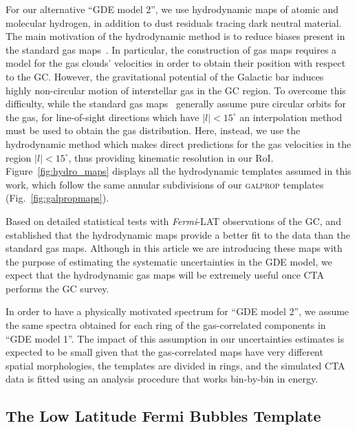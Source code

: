 \documentclass[doublespace,draft,nopageskip]{VTthesis} %
\begin{document}
For our alternative ``GDE model 2'', we use hydrodynamic maps of atomic and molecular hydrogen, in addition to dust residuals tracing dark neutral material. The main motivation of the hydrodynamic method is to reduce biases present in the standard gas maps~\citep{Ackermann:2012}. In particular, the construction of gas maps requires a model for the gas clouds' velocities in order to obtain their position with respect to the GC. 
However, the gravitational potential of the Galactic bar induces highly non-circular motion of interstellar gas in the GC region. 
%
To overcome this difficulty, while the standard gas maps~\citep{Ackermann:2012} generally assume pure circular orbits for the gas, for line-of-sight directions which have $\lvert l \rvert < 15^\circ $ an interpolation method must be used to obtain the gas distribution. 
%
Here, instead, we use the hydrodynamic method \citep{Pohl2008,Macias:2016nev} which makes direct predictions for the gas velocities in the region $\lvert l \rvert < 15^\circ $, thus providing kinematic resolution in our RoI. Figure~\ref{fig:hydro_maps} displays all the hydrodynamic templates assumed in this work, which follow the same annular subdivisions of our \textsc{galprop} templates (Fig.~\ref{fig:galpropmaps}).

Based on detailed statistical tests with \textit{Fermi}-LAT observations of the GC, \cite{Macias:2016nev,Macias:2019omb} and \cite{Buschmann:2020adf} established that the hydrodynamic maps provide a better fit to the data than the standard gas maps. Although in this article we are introducing these  maps with the purpose of estimating the systematic uncertainties in the GDE model, we expect that the hydrodynamic gas maps will be extremely useful once CTA~\citep{Acharyya:2020sbj} performs the GC survey.  

In order to have a physically motivated spectrum for ``GDE model 2'', we assume the same spectra obtained for each ring of the gas-correlated components in ``GDE model 1''. The impact of this assumption in our uncertainties estimates is expected to be small given that the gas-correlated maps have very different spatial morphologies, the templates are divided in rings, and the simulated CTA data is fitted using an analysis procedure that works bin-by-bin in energy. 


\subsection{The Low Latitude Fermi Bubbles Template}
\label{subsec:FBs}
\end{document}
